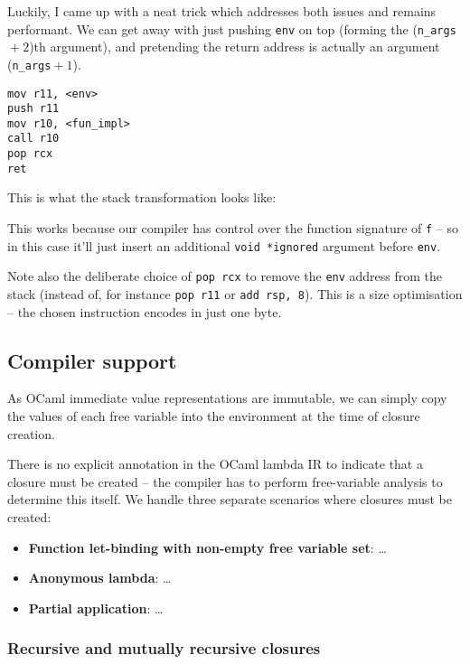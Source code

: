 \documentclass[12pt,a4paper,twoside,openright]{report}
\begin{document}
Luckily, I came up with a neat trick which addresses both issues and remains performant. We can get away with just pushing \lstinline{env} on top (forming the (\lstinline{n_args}${}+2$)th argument), and pretending the return address is actually an argument (\lstinline{n_args}${}+1$).

\begin{lstlisting}
mov r11, <env>
push r11
mov r10, <fun_impl>
call r10
pop rcx
ret
\end{lstlisting}

This is what the stack transformation looks like: %

This works because our compiler has control over the function signature of
\lstinline{f}
-- so in this case it'll just insert an additional \lstinline{void *ignored} argument before \lstinline{env}.

Note also the deliberate choice of \lstinline{pop rcx} to remove the \lstinline{env} address from the stack (instead of, for instance \lstinline{pop r11} or \lstinline{add rsp, 8}). This is a size optimisation -- the chosen instruction encodes in just one byte.

\subsection{Compiler support}

As OCaml immediate value representations are immutable, we can simply copy the values of each free variable into the environment at the time of closure creation.

There is no explicit annotation in the OCaml lambda IR to indicate that a closure must be created -- the compiler has to perform free-variable analysis to determine this itself. We handle three separate scenarios where closures must be created:

\begin{itemize}
    \item \textbf{Function let-binding with non-empty free variable set}:
        \ldots
    \item \textbf{Anonymous lambda}:
        \ldots
    \item \textbf{Partial application}:
        \ldots
\end{itemize}

\subsubsection{Recursive and mutually recursive closures}
\end{document}

